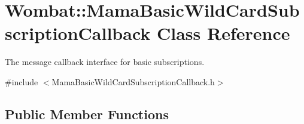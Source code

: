 \hypertarget{classWombat_1_1MamaBasicWildCardSubscriptionCallback}{
\section{Wombat::MamaBasicWildCardSubscriptionCallback Class Reference}
\label{classWombat_1_1MamaBasicWildCardSubscriptionCallback}
}


The message callback interface for basic subscriptions.  


{\ttfamily \#include $<$MamaBasicWildCardSubscriptionCallback.h$>$}\subsection*{Public Member Functions}
